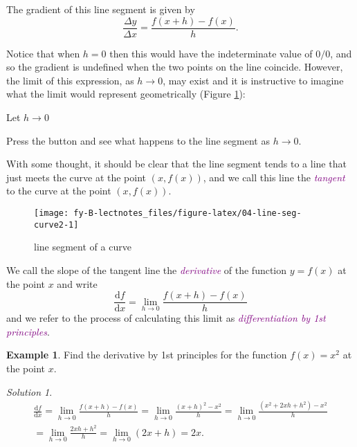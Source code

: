 \documentclass[
  english,
  11pt,
  oneside]{book}
\newcommand{\slide}{}
\theoremstyle{definition}
\theoremstyle{definition}
\newtheorem{example}{Example}[chapter]
\theoremstyle{definition}
\theoremstyle{definition}
\theoremstyle{remark}
\newtheorem*{solution}{Solution}
\begin{document}
The gradient of this line segment is given by
\[
\frac{\Delta y}{\Delta x} = \frac{f(x+h)-f(x)}{h}.
\]
\slide

Notice that when \(h=0\) then this would have the indeterminate value of \(0/0\), and so the gradient is undefined when the two points on the line coincide. However, the limit of this expression, as \(h\to0\), may exist and it is instructive to imagine what the limit would represent geometrically (Figure \ref{fig:04-line-seg-curve2}):

\begin{htmlonly}

\protect{}\label{div_head}
Let \(h\to 0\)

\protect{}\label{div_body}

Press the button and see what happens to the line segment as \(h\to0\).

\end{htmlonly}

With some thought, it should be clear that the line segment tends to a line that just meets the curve at the point \((x,f(x))\), and we call this line the \textcolor{purple}{\em tangent} to the curve at the point \((x,f(x))\).

\begin{figure}

{\centering \texttt{[image: fy-B-lectnotes\_files/figure-latex/04-line-seg-curve2-1]} 

}

\caption{line segment of a curve}\label{fig:04-line-seg-curve2}
\end{figure}

\slide

We call the slope of the tangent line the \textcolor{purple}{\em derivative} of the function \(y=f(x)\) at the point \(x\) and write
\[
\frac{\mathrm{d} f}{\mathrm{d} x} = \lim\limits_{h\to0}\frac{f(x+h)-f(x)}{h}
\]
and we refer to the process of calculating this limit as \textcolor{purple}{\em differentiation by 1st principles}.

\slide

\begin{example}
Find the derivative by 1st principles for the function \(f(x) = x^2\) at the point \(x\).
\end{example}

\begin{solution}
\begin{gather*}
\frac{\mathrm{d} f}{\mathrm{d} x} = \lim\limits_{h\to0}\frac{f(x+h)-f(x)}{h} = \lim\limits_{h\to0}\frac{(x+h)^2 - x^2}{h} = \lim\limits_{h\to0}\frac{(x^2+2xh+h^2)-x^2}{h}\\ = \lim\limits_{h\to0}\frac{2xh+h^2}{h} = \lim\limits_{h\to0}(2x+h) = 2x.
\end{gather*}
\end{solution}
\end{document}

